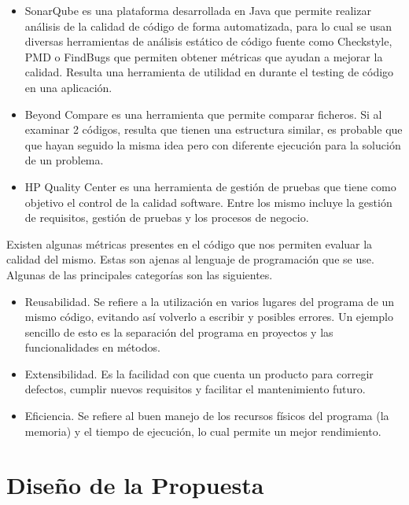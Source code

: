 \documentclass[a4paper,12pt]{book}
\begin{document}
	\begin{itemize}
		\item SonarQube es una plataforma desarrollada en Java que permite realizar análisis de la calidad de código de forma automatizada, para lo cual se usan diversas herramientas de análisis estático de código fuente como Checkstyle, PMD o FindBugs que permiten obtener métricas que ayudan a mejorar la calidad. Resulta una herramienta de utilidad en durante el testing de código en una aplicación.
		
		\item Beyond Compare es una herramienta que permite comparar ficheros. Si al examinar 2 códigos, resulta que tienen una estructura similar, es probable que que hayan seguido la misma idea pero con diferente ejecución para la solución de un problema.
		
		\item HP Quality Center es una herramienta de gestión de pruebas que tiene como objetivo el control de la calidad software. Entre los mismo incluye la gestión de requisitos, gestión de pruebas y los procesos de negocio.
	\end{itemize}
	
	Existen algunas métricas presentes en el código que nos permiten evaluar la calidad del mismo. Estas son ajenas al lenguaje de programación que se use. Algunas de las principales categorías son las siguientes.
	
	\begin{itemize}
		\item Reusabilidad. Se refiere a la utilización en varios lugares del programa de un mismo código, evitando así volverlo a escribir y posibles errores. Un ejemplo sencillo de esto es la separación del programa en proyectos y las funcionalidades en métodos.
		
		\item Extensibilidad. Es la facilidad con que cuenta un producto para corregir defectos, cumplir nuevos requisitos y facilitar el mantenimiento futuro.

		\item Eficiencia. Se refiere al buen manejo de los recursos físicos del programa (la memoria) y el tiempo de ejecución, lo cual permite un mejor rendimiento.
	\end{itemize}
		
		
\chapter{Diseño de la Propuesta}
\end{document}
